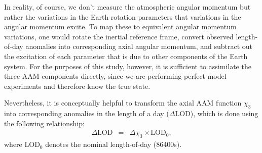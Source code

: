 In reality, of course, we don't measure the atmospheric angular momentum but rather the variations in the Earth rotation parameters that variations in the angular momentum excite. 
To map these to equivalent angular momentum variations, one would rotate the inertial reference frame, convert observed length-of-day anomalies into corresponding axial angular momentum, and subtract out the excitation of each parameter that is due to other components of the Earth system.
For the purposes of this study, however, it is sufficient to assimilate the three AAM components directly, since we are performing perfect model experiments and therefore know the true state.

Nevertheless, it is conceptually helpful to transform the axial AAM function $\chi_3$ into corresponding anomalies in the length of a day ($\Delta$LOD), which is done using the following relationship:
\begin{eqnarray}
\Delta \text{LOD} &=& \Delta \chi_3 \times \text{LOD}_0 ,
\label{eq:X3_to_LOD}
\end{eqnarray}
where $\text{LOD}_0$ denotes the nominal length-of-day (86400s).  

